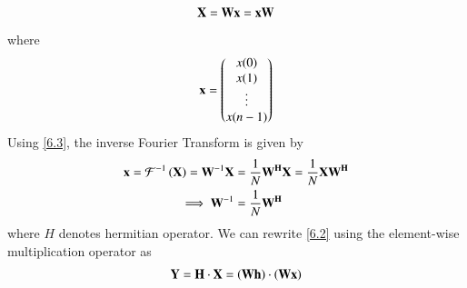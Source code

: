 \documentclass[journal,12pt,twocolumn]{IEEEtran}
\renewcommand\thesection{\arabic{section}}
\begin{document}
\begin{enumerate}[label=\thesection.\arabic*
,ref=\thesection.\theenumi]
\begin{align}
	\mathbf{X} = \mathbf{W}\mathbf{x} = \mathbf{x}\mathbf{W}
\end{align}
\noindent where
\begin{align}
	\mathbf{x} = 
	\begin{pmatrix}
		x(0) \\ x(1) \\ \vdots \\ x(n - 1)
	\end{pmatrix}
\end{align}
\noindent Using \eqref{6.3}, the inverse Fourier Transform is given by
\begin{align}
	\mathbf{x} = \mathcal{F}^{-1}\left(\mathbf{X}\right) = \mathbf{W}^{-1}\mathbf{X} &= \frac{1}{N}\mathbf{W^{H}}\mathbf{X} = \frac{1}{N}\mathbf{X}\mathbf{W^{H}} \\ 
	\implies \mathbf{W}^{-1} &= \frac{1}{N}\mathbf{W^{H}}
\end{align}
\noindent where $H$ denotes hermitian operator. We can rewrite \eqref{6.2} using the element-wise multiplication operator as
\begin{align}
	\mathbf{Y} = \mathbf{H}\cdot\mathbf{X} = \left(\mathbf{W}\mathbf{h}\right)\cdot\left(\mathbf{W}\mathbf{x}\right)
\end{align}
\end{enumerate}
\end{document}

